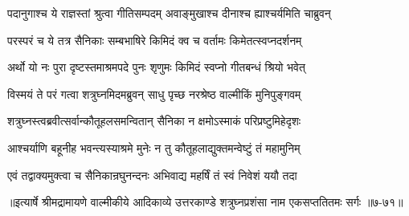 \twolineshloka
{पदानुगाश्च ये राज्ञस्तां श्रुत्वा गीतिसम्पदम्}
{अवाङ्मुखाश्च दीनाश्च ह्याश्चर्यमिति चाब्रुवन्} %

\twolineshloka
{परस्परं च ये तत्र सैनिकाः सम्बभाषिरे}
{किमिदं क्व च वर्तामः किमेतत्स्वप्नदर्शनम्} %

\twolineshloka
{अर्थो यो नः पुरा दृष्टस्तमाश्रमपदे पुनः}
{शृणुमः किमिदं स्वप्नो गीतबन्धं श्रियो भवेत्} %

\twolineshloka
{विस्मयं ते परं गत्वा शत्रुघ्नमिदमब्रुवन्}
{साधु पृच्छ नरश्रेष्ठ वाल्मीकिं मुनिपुङ्गवम्} %

\twolineshloka
{शत्रुघ्नस्त्वब्रवीत्सर्वान्कौतूहलसमन्वितान्}
{सैनिका न क्षमोऽस्माकं परिप्रष्टुमिहेदृशः} %

\twolineshloka
{आश्चर्याणि बहूनीह भवन्त्यस्याश्रमे मुनेः}
{न तु कौतूहलाद्युक्तमन्वेष्टुं तं महामुनिम्} %

\twolineshloka
{एवं तद्वाक्यमुक्त्वा च सैनिकान्रघुनन्दनः}
{अभिवाद्य महर्षिं तं स्वं निवेशं ययौ तदा} %


॥इत्यार्षे श्रीमद्रामायणे वाल्मीकीये आदिकाव्ये उत्तरकाण्डे शत्रुघ्नप्रशंसा नाम एकसप्ततितमः सर्गः ॥७-७१॥
